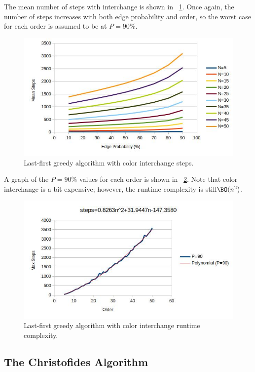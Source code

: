 The mean number of steps with interchange is shown in \figurename~\ref{fig:greedyint:steps}.  Once again, the
number of steps increases with both edge probability and order, so the worst case for each order is assumed to be
at \(P=90\%\).

\begin{figure}[H]
  \centering
  \includegraphics[width=5in]{greedyint_steps}
  \caption{Last-first greedy algorithm with color interchange steps.}
  \label{fig:greedyint:steps}
\end{figure}

A graph of the \(P=90\%\) values for each order is shown in \figurename~\ref{fig:greedyint:runtime}.  Note that
color interchange is a bit expensive; however, the runtime complexity is still\(\BO(n^2)\).

\begin{figure}[H]
  \centering
  \includegraphics[width=5in]{greedyint_runtime}
  \caption{Last-first greedy algorithm with color interchange runtime complexity.}
  \label{fig:greedyint:runtime}
\end{figure}

\subsection{The Christofides Algorithm}\label{sec:sub:christofides}

